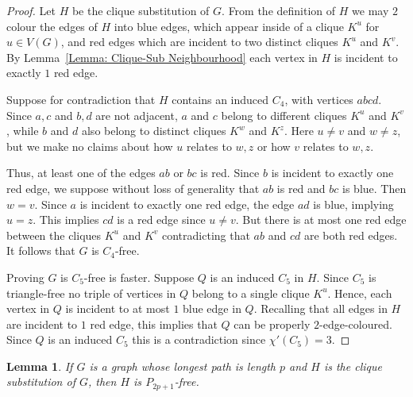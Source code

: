 \documentclass[12pt]{article}
\newtheorem{lemma}[theorem]{Lemma}
\theoremstyle{definition}
\begin{document}
\begin{proof}
    Let $H$ be the clique substitution  of $G$.
    From the definition of $H$ we may $2$ colour the edges of $H$ into blue edges, which appear inside of a clique $K^u$ 
    for $u \in V(G)$, and red edges which are incident to two distinct cliques $K^u$ and $K^v$.
    By Lemma~\ref{Lemma: Clique-Sub Neighbourhood} each vertex in $H$ is incident to exactly $1$ red edge.
    
    Suppose for contradiction that $H$ contains an induced $C_4$, with vertices $abcd$.
    Since $a,c$ and $b,d$ are not adjacent, $a$ and $c$ belong to different cliques $K^u$ and $K^v$,
    while $b$ and $d$ also belong to distinct cliques $K^w$ and $K^z$.
    Here $u\neq v$ and $w \neq z$, but we make no claims about how $u$ relates to $w,z$ or how $v$ relates to $w,z$.
    
    Thus, at least one of the edges $ab$ or $bc$ is red.
    Since $b$ is incident to exactly one red edge, we suppose without loss of generality that $ab$ is red and $bc$ is blue.
    Then $w = v$.
    Since $a$ is incident to exactly one red edge, the edge $ad$ is blue, implying $u = z$.
    This implies $cd$ is a red edge since $u \neq v$.
    But there is at most one red edge between the cliques $K^u$ and $K^v$ contradicting that $ab$ and $cd$ are both red edges.
    It follows that $G$ is $C_4$-free.

    Proving $G$ is $C_5$-free is faster.
    Suppose $Q$ is an induced $C_5$ in $H$.
    Since $C_5$ is triangle-free no triple of vertices in $Q$ belong to a single clique $K^u$.
    Hence, each vertex in $Q$ is incident to at most $1$ blue edge in $Q$.
    Recalling that all edges in $H$ are incident to $1$ red edge, this implies that $Q$ can be properly $2$-edge-coloured.
    Since $Q$ is an induced $C_5$ this is a contradiction since $\chi'(C_5)= 3$.
\end{proof}


\begin{lemma}\label{Lemma: Clique-Sub induced paths}
    If $G$ is a graph whose longest path is length $p$ and $H$ is the clique substitution  of $G$, then $H$ is $P_{2p+1}$-free.
\end{lemma}
\end{document}
